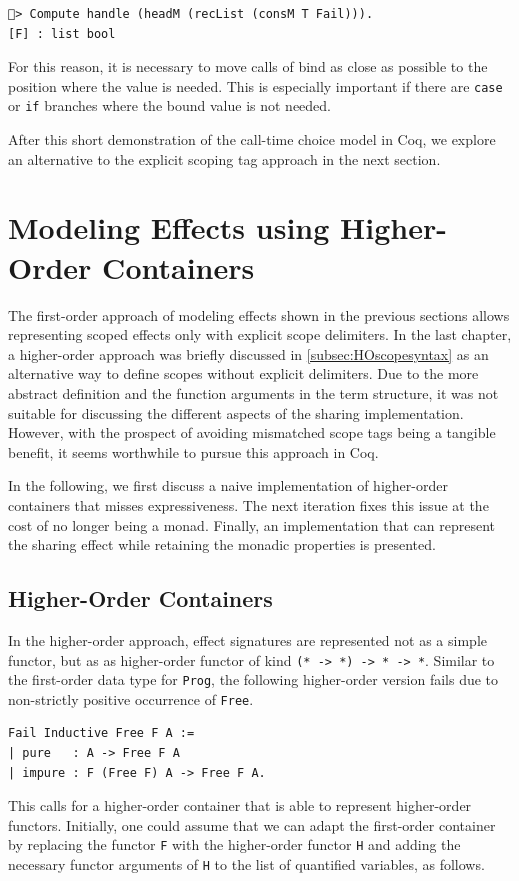 \documentclass[a4paper, 11pt, fleqn, twoside, abstract=on]{scrreprt}
\newcommand{\hinl}[1]{\texttt{#1}}
\newcommand{\cinl}[1]{\texttt{#1}}
\begin{document}
\begin{verbatim}
🐔> Compute handle (headM (recList (consM T Fail))).
[F] : list bool
\end{verbatim}
\noindent
For this reason, it is necessary to move calls of bind as close as possible to the position where the value is needed.
This is especially important if there are \cinl{case} or \cinl{if} branches where the bound value is not needed.

After this short demonstration of the call-time choice model in Coq, we explore an alternative to the explicit scoping tag approach in the next section.

\section{Modeling Effects using Higher-Order Containers}
\label{sec:coqHO}

The first-order approach of modeling effects shown in the previous sections allows representing scoped effects only with explicit scope delimiters.
In the last chapter, a higher-order approach was briefly discussed in \autoref{subsec:HOscopesyntax} as an alternative way to define scopes without explicit delimiters.
Due to the more abstract definition and the function arguments in the term structure, it was not suitable for discussing the different aspects of the sharing implementation.
However, with the prospect of avoiding mismatched scope tags being a tangible benefit, it seems worthwhile to pursue this approach in Coq.

In the following, we first discuss a naive implementation of higher-order containers that misses expressiveness.
The next iteration fixes this issue at the cost of no longer being a monad.
Finally, an implementation that can represent the sharing effect while retaining the monadic properties is presented.

\subsection{Higher-Order Containers}
\label{subsec-higherOrderContainers}
In the higher-order approach, effect signatures are represented not as a simple functor, but as as higher-order functor of kind \hinl{(* -> *) -> * -> *}.
Similar to the first-order data type for \hinl{Prog}, the following higher-order version fails due to non-strictly positive occurrence of \cinl{Free}.

\begin{verbatim}
Fail Inductive Free F A :=
| pure   : A -> Free F A
| impure : F (Free F) A -> Free F A.
\end{verbatim}
\noindent
This calls for a higher-order container that is able to represent higher-order functors.
Initially, one could assume that we can adapt the first-order container by replacing the functor \cinl{F} with the higher-order functor \cinl{H} and adding the necessary functor arguments of \cinl{H} to the list of quantified variables, as follows.
\end{document}
